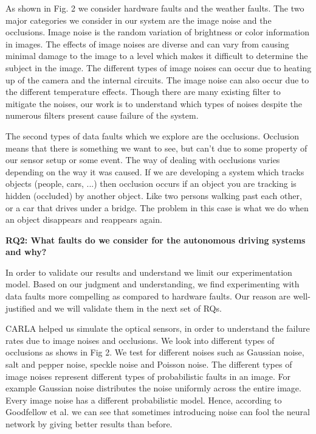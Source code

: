 As shown in Fig. 2 we consider hardware faults and the weather faults. The two major categories we consider in our system are the image noise and the occlusions. Image noise is the random variation of brightness or color information in images.
The effects of image noises are diverse and can vary from causing minimal damage to the image to
a level which makes it difficult to determine the subject in the image. The different types of image noises can occur due to heating up of the camera and the internal circuits. The image noise can also occur due to the different temperature effects. Though there are many existing filter to mitigate the noises, our work is to understand which types of noises despite the numerous filters present cause failure of the system. 

The second types of data faults which we explore are the occlusions. Occlusion means that there is something we want to see, but can't due to some property of our sensor setup or some event. The way of dealing with occlusions varies depending on the way it was caused. If we are developing a system which tracks objects (people, cars, ...) then occlusion occurs if an object you are tracking is hidden (occluded) by another object. Like two persons walking past each other, or a car that drives under a bridge. The problem in this case is what we do when an object disappears and reappears again.

\textbf{RQ2: What faults do we consider for the autonomous driving systems and why?}

In order to validate our results and understand we limit our experimentation model. Based on our judgment and understanding, we find experimenting with data faults more compelling as compared to hardware faults. Our reason are well-justified and we will validate them in the next set of RQs.

CARLA helped us simulate the optical sensors, in order to understand the failure rates due to image noises and occlusions. We look into different types of occlusions as shows in Fig 2. We test for different noises such as Gaussian noise, salt and pepper noise, speckle noise and Poisson noise. The different types of image noises represent different types of probabilistic faults in an image. For example Gaussian noise distributes the noise uniformly across the entire image. Every image noise has a different probabilistic model. Hence, according to Goodfellow et al. \cite{2014arXiv1412.6572G} we can see that sometimes introducing noise can fool the neural network by giving better results than before. 

